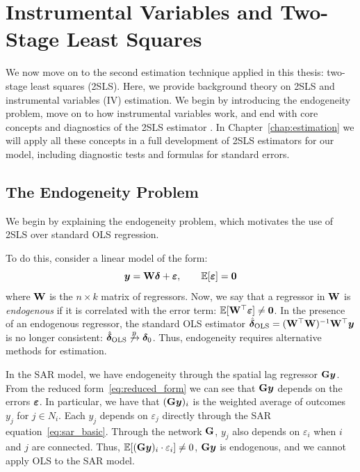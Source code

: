 \section{Instrumental Variables and Two-Stage Least Squares}
\label{sec:bg:iv}
We now move on to the second estimation technique applied in this thesis: two-stage least squares (2SLS). Here, we provide background theory on 2SLS and instrumental variables (IV) estimation. We begin by introducing the endogeneity problem, move on to how instrumental variables work, and end with core concepts and diagnostics of the 2SLS estimator \parencite[Ch.~4]{Angrist2009}. In Chapter~\ref{chap:estimation} we will apply all these concepts in a full development of 2SLS estimators for our model, including diagnostic tests and formulas for standard errors.

\subsection{The Endogeneity Problem}

We begin by explaining the endogeneity problem, which motivates the use of 2SLS over standard OLS regression.

To do this, consider a linear model of the form:
\begin{equation}
\label{eq:iv_model}
    \bm{y} = \mathbf{W}\bm{\delta} + \bm{\varepsilon}, \qquad \mathbb{E}[\bm{\varepsilon}] = \bm{0}
\end{equation}
where $\mathbf{W}$ is the $n \times k$ matrix of regressors. Now, we say that a regressor in $\mathbf{W}$ is \emph{endogenous} if it is correlated with the error term: $\mathbb{E}[\mathbf{W}^\top\bm{\varepsilon}] \neq \bm{0}$. In the presence of an endogenous regressor, the standard OLS estimator $\hat{\bm{\delta}}_{\text{OLS}} = (\mathbf{W}^\top\mathbf{W})^{-1}\mathbf{W}^\top\bm{y}$ is no longer consistent: $\hat{\bm{\delta}}_{\text{OLS}} \not\xrightarrow{p} \bm{\delta}_0$. Thus, endogeneity requires alternative methods for estimation.

In the SAR model, we have endogeneity through the spatial lag regressor $\mathbf{G}\bm{y}$. From the reduced form~\eqref{eq:reduced_form} we can see that $\mathbf{G}\bm{y}$ depends on the errors $\bm{\varepsilon}$. In particular, we have that $(\mathbf{G}\bm{y})_i$ is the weighted average of outcomes $y_j$ for $j \in N_i$. Each $y_j$ depends on $\varepsilon_j$ directly through the SAR equation~\eqref{eq:sar_basic}. Through the network $\mathbf{G}$, $y_j$ also depends on $\varepsilon_i$ when $i$ and $j$ are connected. Thus, $\mathbb{E}[(\mathbf{G}\bm{y})_i \cdot \varepsilon_i] \neq 0$, $\mathbf{G}\bm{y}$ is endogenous, and we cannot apply OLS to the SAR model.

